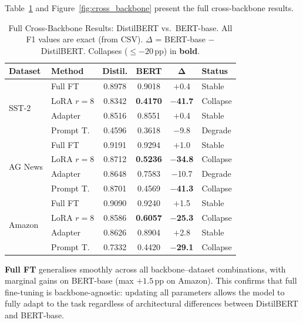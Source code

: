 \documentclass[conference]{IEEEtran}
\begin{document}
Table~\ref{tab:cross_backbone} and Figure~\ref{fig:cross_backbone} present the full cross-backbone results.

\begin{table}[ht]
\centering
\caption{Full Cross-Backbone Results: DistilBERT vs.\ BERT-base. All F1 values are exact (from CSV). $\Delta$ = BERT-base $-$ DistilBERT. Collapses (${\leq}{-20}$\,pp) in \textbf{bold}.}
\label{tab:cross_backbone}
\renewcommand{\arraystretch}{1.2}
\setlength{\tabcolsep}{3pt}
\begin{tabular}{llcccl}
\toprule
\textbf{Dataset} & \textbf{Method} & \textbf{Distil.} & \textbf{BERT} & $\boldsymbol{\Delta}$ & \textbf{Status}\\
\midrule
\multirow{4}{*}{SST-2}
  & Full FT     & 0.8978 & 0.9018 & $+$0.4  & Stable\\
  & LoRA $r{=}8$& 0.8342 & \textbf{0.4170} & \textbf{$-$41.7} & Collapse\\
  & Adapter     & 0.8516 & 0.8551 & $+$0.4  & Stable\\
  & Prompt T.   & 0.4596 & 0.3618 & $-$9.8  & Degrade\\
\midrule
\multirow{4}{*}{AG News}
  & Full FT     & 0.9191 & 0.9294 & $+$1.0  & Stable\\
  & LoRA $r{=}8$& 0.8712 & \textbf{0.5236} & \textbf{$-$34.8} & Collapse\\
  & Adapter     & 0.8648 & 0.7583 & $-$10.7 & Degrade\\
  & Prompt T.   & 0.8701 & 0.4569 & \textbf{$-$41.3} & Collapse\\
\midrule
\multirow{4}{*}{Amazon}
  & Full FT     & 0.9090 & 0.9240 & $+$1.5  & Stable\\
  & LoRA $r{=}8$& 0.8586 & \textbf{0.6057} & \textbf{$-$25.3} & Collapse\\
  & Adapter     & 0.8626 & 0.8904 & $+$2.8  & Stable\\
  & Prompt T.   & 0.7332 & 0.4420 & \textbf{$-$29.1} & Collapse\\
\bottomrule
\end{tabular}
\end{table}

\textbf{Full FT} generalises smoothly across all backbone--dataset combinations, with marginal gains on BERT-base (max $+1.5$\,pp on Amazon). This confirms that full fine-tuning is backbone-agnostic: updating all parameters allows the model to fully adapt to the task regardless of architectural differences between DistilBERT and BERT-base.
\end{document}
